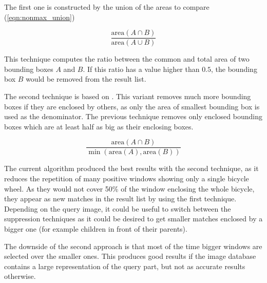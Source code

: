 The first one is constructed by the union of the areas to compare (\ref{eqn:nonmax_union})

\begin{equation}
\frac{\text{area}(A \cap B)}{\text{area}(A \cup B)}
\label{eqn:nonmax_union}
\end{equation}

This technique computes the ratio between the common and total area of two bounding boxes $A$ and $B$. If this ratio has a value higher than $0.5$, the bounding box $B$ would be removed from the result list.

The second technique is based on . This variant removes much more bounding boxes if they are enclosed by others, as only the area of smallest bounding box is used as the denominator. The previous technique removes only enclosed bounding boxes which are at least half as big as their enclosing boxes.

\begin{equation}
\frac{\text{area}(A \cap B)}{\min(\text{area}(A), \text{area}(B))}
\label{eqn:nonmax_min}
\end{equation}

The current algorithm produced the best results with the second technique, as it reduces the repetition of many positive windows showing only a single bicycle wheel. As they would not cover 50\% of the window enclosing the whole bicycle, they appear as new matches in the result list by using the first technique. Depending on the query image, it could be useful to switch between the suppression techniques as it could be desired to get smaller matches enclosed by a bigger one (for example children in front of their parents).

The downside of the second approach is that most of the time bigger windows are selected over the smaller ones. This produces good results if the image database contains a large representation of the query part, but not as accurate results otherwise.
